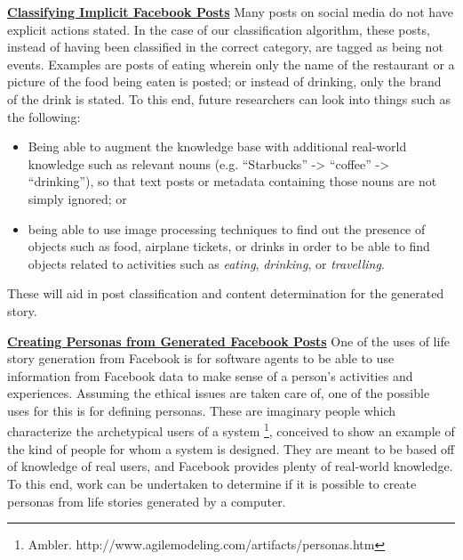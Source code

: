 \underline{\textbf{Classifying Implicit Facebook Posts}}
Many posts on social media do not have explicit actions stated. In the case of our classification algorithm, these posts, instead of having been classified in the correct category, are tagged as being not events. Examples are posts of eating wherein only the name of the restaurant or a picture of the food being eaten is posted; or instead of drinking, only the brand of the drink is stated. To this end, future researchers can look into things such as the following:
\begin{itemize}
	\item Being able to augment the knowledge base with additional real-world knowledge such as relevant nouns (e.g. ``Starbucks” -> ``coffee” -> ``drinking”), so that text posts or metadata containing those nouns are not simply ignored; or 
	\item being able to use image processing techniques to find out the presence of objects such as food, airplane tickets, or drinks in order to be able to find objects related to activities such as \textit{eating}, \textit{drinking}, or \textit{travelling}.
\end{itemize}
These will aid in post classification and content determination for the generated story.

\underline{\textbf{Creating Personas from Generated Facebook Posts}}
One of the uses of life story generation from Facebook is for software agents to be able to use information from Facebook data to make sense of a person’s activities and experiences. Assuming the ethical issues are taken care of, one of the possible uses for this is for defining personas. These are imaginary people which characterize the archetypical users of a system \footnote{Ambler. http://www.agilemodeling.com/artifacts/personas.htm}, conceived to show an example of the kind of people for whom a system is designed. They are meant to be based off of knowledge of real users, and Facebook provides plenty of real-world knowledge. To this end, work can be undertaken to determine if it is possible to create personas from life stories generated by a computer.

